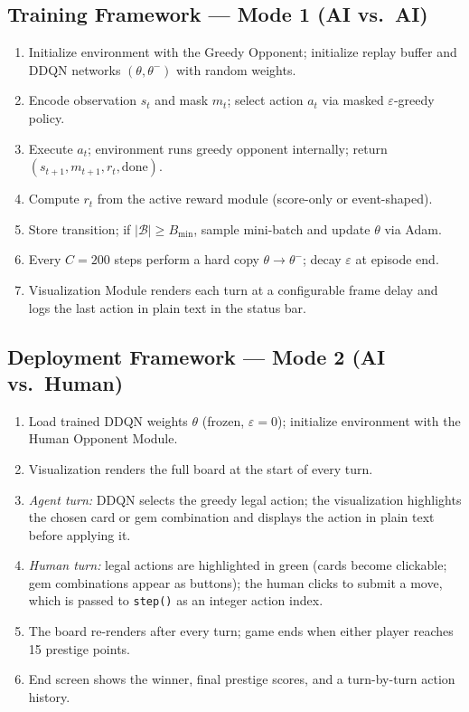 \documentclass[11pt]{article}
\begin{document}
\subsection{Training Framework — Mode 1 (AI vs.\ AI)}

\begin{enumerate}
  \item Initialize environment with the Greedy Opponent; initialize replay buffer and
        DDQN networks $(\theta,\theta^{-})$ with random weights.
  \item Encode observation $s_t$ and mask $m_t$; select action $a_t$ via masked
        $\varepsilon$-greedy policy.
  \item Execute $a_t$; environment runs greedy opponent internally; return
        $(s_{t+1}, m_{t+1}, r_t, \text{done})$.
  \item Compute $r_t$ from the active reward module (score-only or event-shaped).
  \item Store transition; if $|\mathcal{B}|\geq B_{\min}$, sample mini-batch and
        update $\theta$ via Adam.
  \item Every $C=200$ steps perform a hard copy $\theta\!\to\!\theta^{-}$;
        decay $\varepsilon$ at episode end.
  \item Visualization Module renders each turn at a configurable frame delay and logs
        the last action in plain text in the status bar.
\end{enumerate}

\subsection{Deployment Framework — Mode 2 (AI vs.\ Human)}

\begin{enumerate}
  \item Load trained DDQN weights $\theta$ (frozen, $\varepsilon=0$); initialize
        environment with the Human Opponent Module.
  \item Visualization renders the full board at the start of every turn.
  \item \textit{Agent turn:} DDQN selects the greedy legal action; the visualization
        highlights the chosen card or gem combination and displays the action in
        plain text before applying it.
  \item \textit{Human turn:} legal actions are highlighted in green (cards become
        clickable; gem combinations appear as buttons); the human clicks to submit a
        move, which is passed to \texttt{step()} as an integer action index.
  \item The board re-renders after every turn; game ends when either player
        reaches 15 prestige points.
  \item End screen shows the winner, final prestige scores, and a turn-by-turn
        action history.
\end{enumerate}
\end{document}
